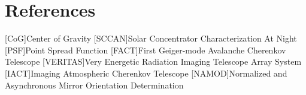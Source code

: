 \documentclass[review]{elsarticle}
\begin{document}
\section*{References}

%
\begin{acronym}
    [CoG]{Center of Gravity}
	[SCCAN]{Solar Concentrator Characterization At Night}
	[PSF]{Point Spread Function}
	[FACT]{First Geiger-mode Avalanche Cherenkov Telescope}
	[VERITAS]{Very Energetic Radiation Imaging Telescope Array System}
    [IACT]{Imaging Atmospheric Cherenkov Telescope}
    [NAMOD]{Normalized and Asynchronous Mirror Orientation Determination}
\end{acronym}
\end{document}
